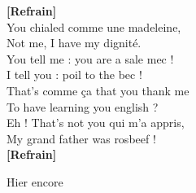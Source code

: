 \documentclass{novel}
\begin{document}
\begin{multicols}{2}
\textbf{[Refrain]}\\

You chialed comme une madeleine,\\
Not me, I have my dignité.\\
You tell me : you are a sale mec !\\
I tell you : poil to the bec !\\

That's comme ça that you thank me\\
To have learning you english ?\\
Eh ! That's not you qui m'a appris,\\
My grand father was rosbeef !\\

\textbf{[Refrain]}\\
\end{multicols}

\newpage
\normalsize

\h*{Hier encore}
\end{document}
